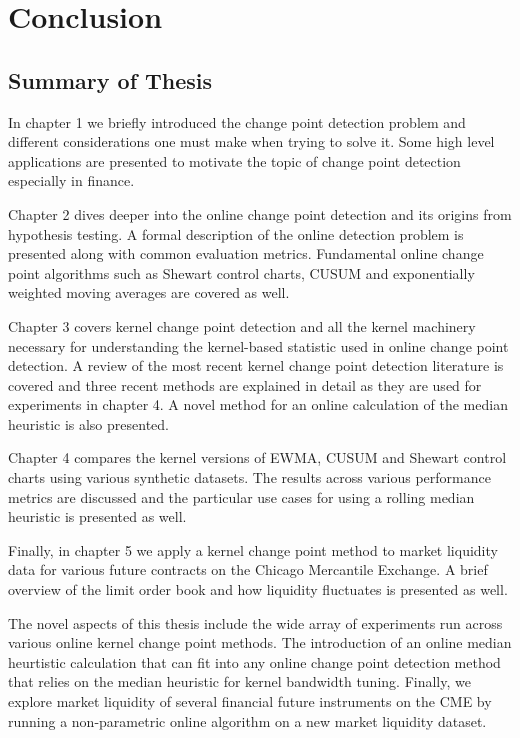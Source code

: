 \chapter{Conclusion}
\section{Summary of Thesis}
In chapter 1 we briefly introduced the change point detection problem and different considerations one must make when trying to solve it. Some high level applications are presented to motivate the topic of change point detection especially in finance.

Chapter 2 dives deeper into the online change point detection and its origins from hypothesis testing. A formal description of the online detection problem is presented along with common evaluation metrics. Fundamental online change point algorithms such as Shewart control charts, CUSUM and exponentially weighted moving averages are covered as well. 

Chapter 3 covers kernel change point detection and all the kernel machinery necessary for understanding the kernel-based statistic used in online change point detection. A review of the most recent kernel change point detection literature is covered and three recent methods are explained in detail as they are used for experiments in chapter 4. A novel method for an online calculation of the median heuristic is also presented. 

Chapter 4 compares the kernel versions of EWMA, CUSUM and Shewart control charts using various synthetic datasets. The results across various performance metrics are discussed and the particular use cases for using a rolling median heuristic is presented as well.

Finally, in chapter 5 we apply a kernel change point method to market liquidity data for various future contracts on the Chicago Mercantile Exchange. A brief overview of the limit order book and how liquidity fluctuates is presented as well.  

The novel aspects of this thesis include the wide array of experiments run across various online kernel change point methods. The introduction of an online median heurtistic calculation that can fit into any online change point detection method that relies on the median heuristic for kernel bandwidth tuning. Finally, we explore market liquidity of several financial future instruments on the CME by running a non-parametric online algorithm on a new market liquidity dataset.

